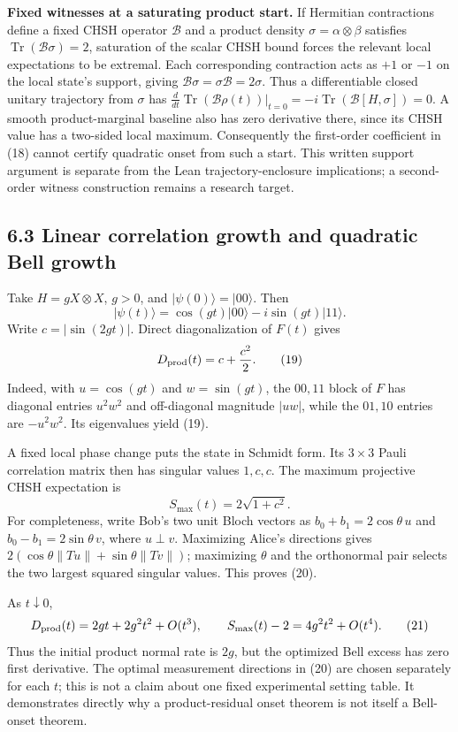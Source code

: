 \documentclass[
]{article}
\begin{document}
\textbf{Fixed witnesses at a saturating product start.} If Hermitian contractions define a fixed CHSH operator \(\mathcal B\) and a product density \(\sigma=\alpha\otimes\beta\) satisfies \(\operatorname{Tr}(\mathcal B\sigma)=2\), saturation of the scalar CHSH bound forces the relevant local expectations to be extremal. Each corresponding contraction acts as \(+1\) or \(-1\) on the local state's support, giving \(\mathcal B\sigma=\sigma\mathcal B=2\sigma\). Thus a differentiable closed unitary trajectory from \(\sigma\) has \(\frac{d}{dt}\operatorname{Tr}(\mathcal B\rho(t))|_{t=0}=-i\operatorname{Tr}(\mathcal B[H,\sigma])=0\). A smooth product-marginal baseline also has zero derivative there, since its CHSH value has a two-sided local maximum. Consequently the first-order coefficient in (18) cannot certify quadratic onset from such a start. This written support argument is separate from the Lean trajectory-enclosure implications; a second-order witness construction remains a research target.

\subsection{6.3 Linear correlation growth and quadratic Bell growth}\label{linear-correlation-growth-and-quadratic-bell-growth}

Take \(H=gX\otimes X\), \(g>0\), and \(|\psi(0)\rangle=|00\rangle\). Then
\[
|\psi(t)\rangle=\cos(gt)|00\rangle-i\sin(gt)|11\rangle.
\]
Write \(c=|\sin(2gt)|\). Direct diagonalization of \(F(t)\) gives
\[
D_{\rm prod}(t)=c+\frac{c^2}{2}.
\tag{19}
\]
Indeed, with \(u=\cos(gt)\) and \(w=\sin(gt)\), the \(00,11\) block of \(F\) has diagonal entries \(u^2w^2\) and off-diagonal magnitude \(|uw|\), while the \(01,10\) entries are \(-u^2w^2\). Its eigenvalues yield (19).

A fixed local phase change puts the state in Schmidt form. Its \(3\times3\) Pauli correlation matrix then has singular values \(1,c,c\). The maximum projective CHSH expectation is
\[
S_{\max}(t)=2\sqrt{1+c^2}.
\tag{20}
\]
For completeness, write Bob's two unit Bloch vectors as \(b_0+b_1=2\cos\theta\,u\) and \(b_0-b_1=2\sin\theta\,v\), where \(u\perp v\). Maximizing Alice's directions gives \(2(\cos\theta\|Tu\|+\sin\theta\|Tv\|)\); maximizing \(\theta\) and the orthonormal pair selects the two largest squared singular values. This proves (20).

As \(t\downarrow0\),
\[
D_{\rm prod}(t)=2gt+2g^2t^2+O(t^3),\qquad
S_{\max}(t)-2=4g^2t^2+O(t^4).
\tag{21}
\]
Thus the initial product normal rate is \(2g\), but the optimized Bell excess has zero first derivative. The optimal measurement directions in (20) are chosen separately for each \(t\); this is not a claim about one fixed experimental setting table. It demonstrates directly why a product-residual onset theorem is not itself a Bell-onset theorem.
\end{document}
